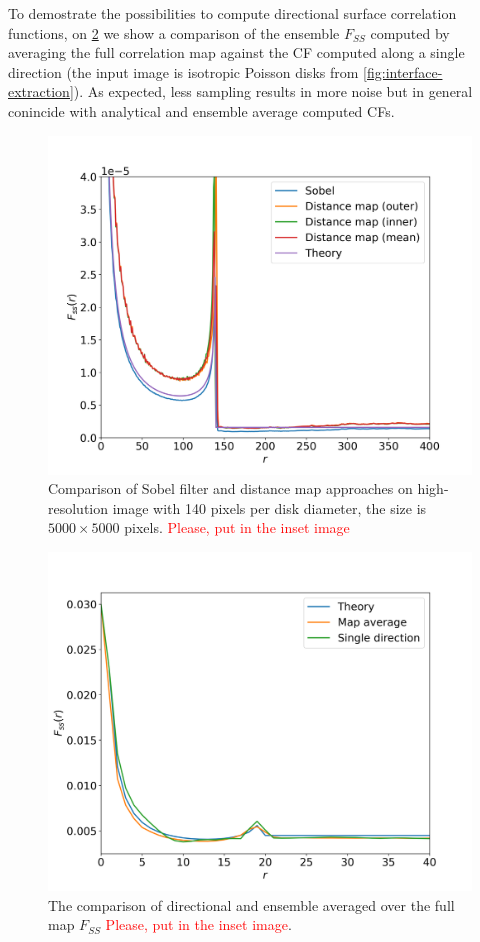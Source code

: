 \documentclass[reprint,amsmath,amssymb,aps,pre,showkeys,showpacs]{revtex4-1}
\begin{document}
To demostrate the possibilities to compute directional surface correlation
functions, on \cref{fig:direction-vs-map} we show a comparison of the ensemble
$F_{SS}$ computed by averaging the full correlation map against the CF computed
along a single direction (the input image is isotropic Poisson disks from
\cref{fig:interface-extraction}). As expected, less sampling results in more
noise but in general conincide with analytical and ensemble average computed
CFs.

\begin{figure}[ht]
  \centering
  \includegraphics[width=\linewidth]{images/sobel-vs-distance-map.png}
  \caption{Comparison of Sobel filter and distance map approaches on
    high-resolution image with 140 pixels per disk diameter, the size is
    $5000 \times 5000$ pixels. \textcolor{red}{Please, put in the inset image}}
  \label{fig:sobel-vs-distance-map}
\end{figure}

\begin{figure}[ht]
  \centering
  \includegraphics[width=\linewidth]{images/direction_and_map.png}
  \caption{The comparison of directional and ensemble averaged over the full map
    $F_{SS}$ \textcolor{red}{Please, put in the inset image}.}
  \label{fig:direction-vs-map}
\end{figure}
\end{document}
